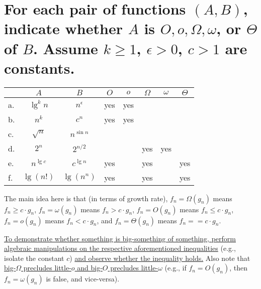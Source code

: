 \section[Problem 5]{For each pair of functions $(A, B)$, indicate whether $A$ is $O, o, \Omega, \omega$, or $\Theta$ of $B$. Assume $k \geq 1$, $\epsilon > 0$, $c > 1$ are constants.}
\begin{center}
	\begin{tabular}{lcc|c|c|c|c|c}
		& $A$ & $B$ & $O$ & $o$ & $\Omega$ & $\omega$ & $\Theta$ \\ \hline
		a. & $\lg^k n$ & $n^{\epsilon}$ & yes & yes &  &  &  \\ \hline
		b. & $n^k$ & $c^n$				& yes & yes &  &  &  \\ \hline
		c. & $\sqrt{n}$ & $n^{\sin n}$	&  &  &  &  &  \\ \hline
		d. & $2^n$ & $2^{n/2}$			&  &  & yes & yes &  \\ \hline
		e. & $n^{\lg c}$ & $c^{\lg n}$	& yes &  & yes &  & yes \\ \hline
		f. & $\lg(n!)$ & $\lg(n^n)$		& yes &  & yes &  & yes 
	\end{tabular}
\end{center}

The main idea here is that (in terms of growth rate), 
$f_n = \Omega(g_n)$ means	$f_n \geq c \cdot g_n$,
$f_n = \omega(g_n)$ means	$f_n > c \cdot g_n$,
$f_n = O(g_n)$ means		$f_n \leq c \cdot g_n$,
$f_n = o(g_n)$ means		$f_n < c \cdot g_n$, and
$f_n = \Theta(g_n)$ means	$f_n == c \cdot g_n$. 

\ul{To demonstrate whether something is big-something of something, perform algebraic manipulations on the respective aforementioned inequalities} (e.g., isolate the constant $c$) \ul{and observe whether the inequality holds.} Also note that \ul{big-$\Omega$ precludes little-$o$ and big-$O$ precludes little-$\omega$} (e.g., if $f_n = O(g_n)$, then $f_n = \omega(g_n)$ is false, and vice-versa).
